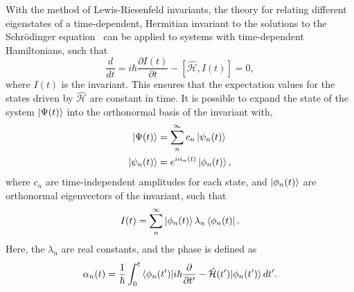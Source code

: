 With the method of Lewis-Riesenfeld invariants, the theory for relating different eigenstates of a time-dependent, Hermitian invariant to the solutions to the Schr\"odinger equation~\cite{lewis1969} can be applied to systems with time-dependent Hamiltonians, such that
\begin{equation}
\frac{d}{dt} = i\hbar \frac{\partial I(t)}{\partial t} - \left[\mathcal{\hat H},I(t)\right] = 0,
\end{equation}
\noindent where $I(t)$ is the invariant.
This ensures that the expectation values for the states driven by $\mathcal{\hat H}$ are constant in time.
It is possible to expand the state of the system $\ket{\Psi(t)}$ into the orthonormal basis of the invariant with,
\begin{align}
\ket{\Psi(t)} &=\sum_n^\infty c_n \ket{\psi_n(t)} \\
\ket{\psi_n(t)} &= e^{i\alpha_n(t)}\ket{\phi_n(t)},
\end{align}
\noindent where $c_n$ are time-independent amplitudes for each state, and $\ket{\phi_n(t)}$ are orthonormal eigenvectors of the invariant, such that
\begin{equation}
I(t) = \sum_n^\infty\ket{\phi_n(t)}\lambda_n\bra{\phi_n(t)}.
\end{equation}
\noindent Here, the $\lambda_n$ are real constants, and the phase is defined as ~\cite{lewis1969}
\begin{equation}
\alpha_n(t) = \frac{1}{\hbar}\int_0^t\braket{\phi_n(t')|i\hbar\frac{\partial}{\partial t'} - \mathcal{\hat H}(t')|\phi_n(t')}dt'.
\end{equation}

